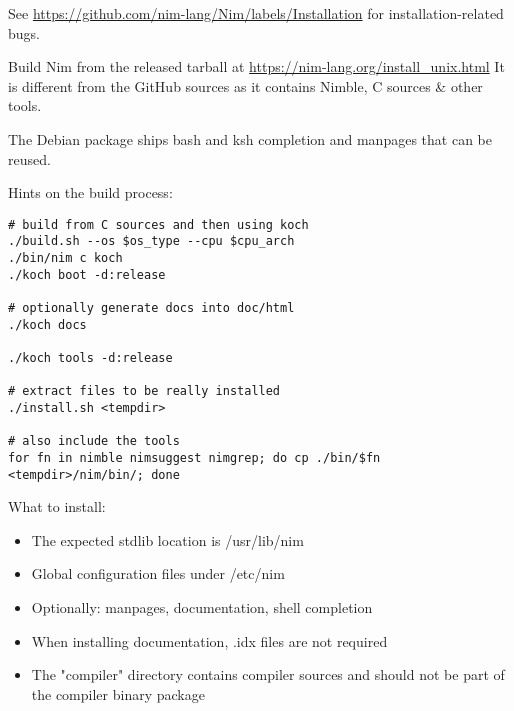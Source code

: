 See \url{https://github.com/nim-lang/Nim/labels/Installation} for
installation-related bugs.

Build Nim from the released tarball at
\url{https://nim-lang.org/install_unix.html} It is different from the
GitHub sources as it contains Nimble, C sources \& other tools.

The Debian package ships bash and ksh completion and manpages that can
be reused.

Hints on the build process:

\begin{verbatim}
# build from C sources and then using koch
./build.sh --os $os_type --cpu $cpu_arch
./bin/nim c koch
./koch boot -d:release

# optionally generate docs into doc/html
./koch docs

./koch tools -d:release

# extract files to be really installed
./install.sh <tempdir>

# also include the tools
for fn in nimble nimsuggest nimgrep; do cp ./bin/$fn <tempdir>/nim/bin/; done
\end{verbatim}

What to install:

\begin{itemize}
\tightlist
\item
  The expected stdlib location is /usr/lib/nim
\item
  Global configuration files under /etc/nim
\item
  Optionally: manpages, documentation, shell completion
\item
  When installing documentation, .idx files are not required
\item
  The "compiler" directory contains compiler sources and should not be
  part of the compiler binary package
\end{itemize}
